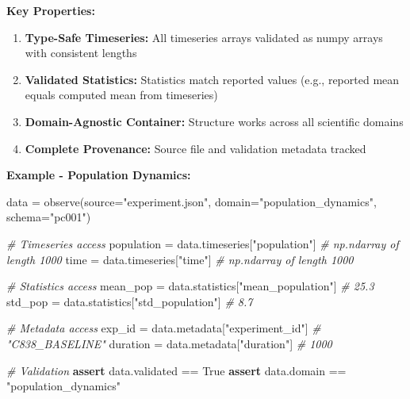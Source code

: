 \documentclass[
]{article}
\newenvironment{Shaded}{}{}
\newcommand{\CommentTok}[1]{\textcolor[rgb]{0.38,0.63,0.69}{\textit{#1}}}
\newcommand{\ControlFlowTok}[1]{\textcolor[rgb]{0.00,0.44,0.13}{\textbf{#1}}}
\newcommand{\NormalTok}[1]{#1}
\newcommand{\OperatorTok}[1]{\textcolor[rgb]{0.40,0.40,0.40}{#1}}
\newcommand{\StringTok}[1]{\textcolor[rgb]{0.25,0.44,0.63}{#1}}
\newcommand{\VariableTok}[1]{\textcolor[rgb]{0.10,0.09,0.49}{#1}}
\providecommand{\tightlist}{%
  \setlength{\itemsep}{0pt}\setlength{\parskip}{0pt}}
\begin{document}
\textbf{Key Properties:}

\begin{enumerate}
\def\labelenumi{\arabic{enumi}.}
\tightlist
\item
  \textbf{Type-Safe Timeseries:} All timeseries arrays validated as
  numpy arrays with consistent lengths
\item
  \textbf{Validated Statistics:} Statistics match reported values (e.g.,
  reported mean equals computed mean from timeseries)
\item
  \textbf{Domain-Agnostic Container:} Structure works across all
  scientific domains
\item
  \textbf{Complete Provenance:} Source file and validation metadata
  tracked
\end{enumerate}

\textbf{Example - Population Dynamics:}

\begin{Shaded}
\begin{Highlighting}[]
\NormalTok{data }\OperatorTok{=}\NormalTok{ observe(source}\OperatorTok{=}\StringTok{"experiment.json"}\NormalTok{, domain}\OperatorTok{=}\StringTok{"population\_dynamics"}\NormalTok{, schema}\OperatorTok{=}\StringTok{"pc001"}\NormalTok{)}

\CommentTok{\# Timeseries access}
\NormalTok{population }\OperatorTok{=}\NormalTok{ data.timeseries[}\StringTok{"population"}\NormalTok{]  }\CommentTok{\# np.ndarray of length 1000}
\NormalTok{time }\OperatorTok{=}\NormalTok{ data.timeseries[}\StringTok{"time"}\NormalTok{]              }\CommentTok{\# np.ndarray of length 1000}

\CommentTok{\# Statistics access}
\NormalTok{mean\_pop }\OperatorTok{=}\NormalTok{ data.statistics[}\StringTok{"mean\_population"}\NormalTok{]  }\CommentTok{\# 25.3}
\NormalTok{std\_pop }\OperatorTok{=}\NormalTok{ data.statistics[}\StringTok{"std\_population"}\NormalTok{]    }\CommentTok{\# 8.7}

\CommentTok{\# Metadata access}
\NormalTok{exp\_id }\OperatorTok{=}\NormalTok{ data.metadata[}\StringTok{"experiment\_id"}\NormalTok{]        }\CommentTok{\# "C838\_BASELINE"}
\NormalTok{duration }\OperatorTok{=}\NormalTok{ data.metadata[}\StringTok{"duration"}\NormalTok{]           }\CommentTok{\# 1000}

\CommentTok{\# Validation}
\ControlFlowTok{assert}\NormalTok{ data.validated }\OperatorTok{==} \VariableTok{True}
\ControlFlowTok{assert}\NormalTok{ data.domain }\OperatorTok{==} \StringTok{"population\_dynamics"}
\end{Highlighting}
\end{Shaded}
\end{document}
